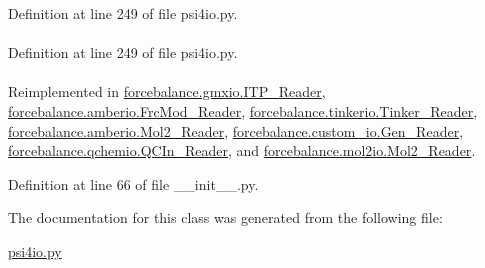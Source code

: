 \-Definition at line 249 of file psi4io.\-py.

\hypertarget{classforcebalance_1_1psi4io_1_1Grid__Reader_a9a2872913fab88d4a8586123f66b6f41}{
\paragraph[{radii}]{}}\label{classforcebalance_1_1psi4io_1_1Grid__Reader_a9a2872913fab88d4a8586123f66b6f41}


\-Definition at line 249 of file psi4io.\-py.

\hypertarget{classforcebalance_1_1BaseReader_a48ef0584a1b6b4b6f8eb741ad8465db8}{
\paragraph[{suffix}]{}}\label{classforcebalance_1_1BaseReader_a48ef0584a1b6b4b6f8eb741ad8465db8}


\-Reimplemented in \hyperlink{classforcebalance_1_1gmxio_1_1ITP__Reader_ab35c32e7ecf74028641613f90906bd37}{forcebalance.\-gmxio.\-I\-T\-P\-\_\-\-Reader}, \hyperlink{classforcebalance_1_1amberio_1_1FrcMod__Reader_ad25c7e07aadb587268f3beb7a379766c}{forcebalance.\-amberio.\-Frc\-Mod\-\_\-\-Reader}, \hyperlink{classforcebalance_1_1tinkerio_1_1Tinker__Reader_a7078ca5338dff178edf5afb05a1f32c8}{forcebalance.\-tinkerio.\-Tinker\-\_\-\-Reader}, \hyperlink{classforcebalance_1_1amberio_1_1Mol2__Reader_a76b4f0ec6731d7072da6be5768ebf979}{forcebalance.\-amberio.\-Mol2\-\_\-\-Reader}, \hyperlink{classforcebalance_1_1custom__io_1_1Gen__Reader_a408f5717e02bcc0d87b8e60bd8b0714e}{forcebalance.\-custom\-\_\-io.\-Gen\-\_\-\-Reader}, \hyperlink{classforcebalance_1_1qchemio_1_1QCIn__Reader_a1ff6018724f2760bb6dd32dd3c854328}{forcebalance.\-qchemio.\-Q\-C\-In\-\_\-\-Reader}, and \hyperlink{classforcebalance_1_1mol2io_1_1Mol2__Reader_a39adb792b05aab536e3376ecf2ec5778}{forcebalance.\-mol2io.\-Mol2\-\_\-\-Reader}.



\-Definition at line 66 of file \-\_\-\-\_\-init\-\_\-\-\_\-.\-py.



\-The documentation for this class was generated from the following file\-:\begin{DoxyCompactItemize}
\item 
\hyperlink{psi4io_8py}{psi4io.\-py}\end{DoxyCompactItemize}
